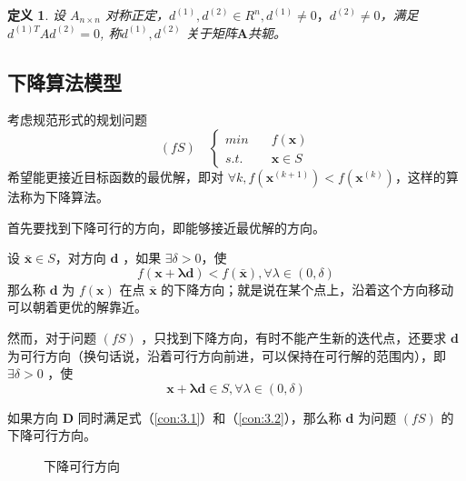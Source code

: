 \documentclass{book}
\newtheorem{definition}{\indent 定义}[chapter]
\begin{document}
\begin{definition}
    设 $A_{n\times n}$ 对称正定，$d^{(1)},d^{(2)} \in R^n,d^{(1)} \ne 0，d^{(2)} \ne 0$，满足$d^{(1)T}Ad^{(2)}=0$, 称$d^{(1)},d^{(2)}$ 关于矩阵$\boldsymbol{A}$共轭。
\end{definition}

\subsection{下降算法模型}

考虑规范形式的规划问题 $$
    (fS)\quad\begin{cases}
        min\quad  & f(\boldsymbol{x})   \\
        s.t.\quad & \boldsymbol{x}\in S
    \end{cases}
$$
希望能更接近目标函数的最优解，即对 $\forall k,f(\boldsymbol{x}^{(k+1)})<f(\boldsymbol{x}^{(k)})$，这样的算法称为下降算法。

首先要找到下降可行的方向，即能够接近最优解的方向。

设 $\bar{\boldsymbol{x}}\in S$，对方向 $\boldsymbol{d}$ ，如果 $\exists\delta>0$，使 \begin{equation}
    f(\boldsymbol{x}+\boldsymbol{\lambda d})<f(\bar{\boldsymbol{x}}),\forall\lambda\in(0,\delta)
    \label{con:3.1}
\end{equation}
那么称 $\boldsymbol{d}$ 为 $f(\boldsymbol{x})$ 在点 $\bar{\boldsymbol{x}}$ 的下降方向；就是说在某个点上，沿着这个方向移动可以朝着更优的解靠近。

然而，对于问题 $(fS)$ ，只找到下降方向，有时不能产生新的迭代点，还要求 $\boldsymbol{d}$ 为可行方向（换句话说，沿着可行方向前进，可以保持在可行解的范围内），即 $\exists\delta>0$ ，使
\begin{equation}
    \boldsymbol{x}+\boldsymbol{\lambda d}\in S,\forall\lambda\in(0,\delta)
    \label{con:3.2}
\end{equation}

如果方向 $\boldsymbol{D}$ 同时满足式（\ref{con:3.1}）和（\ref{con:3.2}），那么称 $\boldsymbol{d}$ 为问题 $(fS)$ 的下降可行方向。

\begin{figure}[ht]
    \centering
    \caption{下降可行方向}
    \label{fig:Feasible Descent Direction}
\end{figure}
\end{document}
